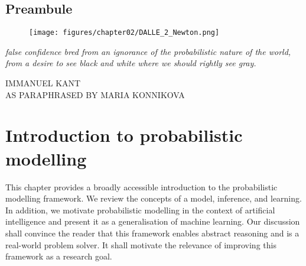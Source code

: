 \thispagestyle{empty}
\section*{Preambule}


\begin{figure}[h]
  \centering

  \texttt{[image: figures/chapter02/DALLE\_2\_Newton.png]}
  \label{}
\end{figure}

\vfill

{
\textit{ false confidence bred from an ignorance of the probabilistic nature of the world, from a desire to see black and white where we should rightly see gray.}

  \par\bigskip
  \raggedleft\MakeUppercase{Immanuel Kant}\\
  \raggedleft\MakeUppercase{AS PARAPHRASED BY MARIA KONNIKOVA}
  \par%
}


\chapter{Introduction to probabilistic modelling}\label{ch:02A}

\begin{chapter_outline}

  This chapter provides a broadly accessible introduction to the probabilistic modelling framework.
  We review the concepts of a model, inference, and learning. In addition, we motivate probabilistic modelling in the context of artificial intelligence and present it as a generalisation of machine learning. Our discussion shall convince the reader that this framework enables abstract reasoning and is a real-world problem solver. It shall motivate the relevance of improving this framework as a research goal.
\end{chapter_outline}

